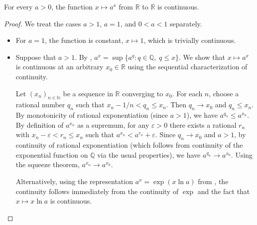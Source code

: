 \begin{proposition} \label{proposition:continuity_of_real_exponentiation}
    For every $a > 0$, the function $x \mapsto a^x$ from $\mathbb{R}$ to $\mathbb{R}$ is continuous.
\end{proposition}
\begin{proof}
    We treat the cases $a > 1$, $a = 1$, and $0 < a < 1$ separately.

    \begin{itemize}
        \item For $a = 1$, the function is constant, $x \mapsto 1$, which is trivially continuous.

        \item Suppose that $a > 1$. By , $a^x = \sup\{a^q : q \in \mathbb{Q},\; q \leq x\}$.
        We show that $x \mapsto a^x$ is continuous at an arbitrary $x_0 \in \mathbb{R}$ using the sequential characterization of continuity.

        Let $(x_n)_{n \in \mathbb{N}}$ be a sequence in $\mathbb{R}$ converging to $x_0$. For each $n$, choose a rational number $q_n$ such that $x_n - 1/n < q_n \leq x_n$. Then $q_n \to x_0$ and $q_n \leq x_n$.
        By monotonicity of rational exponentiation (since $a > 1$), we have $a^{q_n} \leq a^{x_n}$. By definition of $a^{x_n}$ as a supremum, for any $\varepsilon > 0$ there exists a rational $r_n$ with $x_n - \varepsilon < r_n \leq x_n$ such that $a^{x_n} < a^{r_n} + \varepsilon$.
        Since $q_n \to x_0$ and $a > 1$, by continuity of rational exponentiation (which follows from continuity of the exponential function on $\mathbb{Q}$ via the usual properties), we have $a^{q_n} \to a^{x_0}$.
        Using the squeeze theorem, $a^{x_n} \to a^{x_0}$.

        Alternatively, using the representation $a^x = \exp(x \ln a)$ from , the continuity follows immediately from the continuity of $\exp$ and the fact that $x \mapsto x \ln a$ is continuous.


\end{itemize}
\end{proof}
